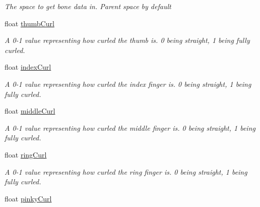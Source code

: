 \begin{DoxyCompactItemize}
\begin{DoxyCompactList}\small\item\em The space to get bone data in. Parent space by default \end{DoxyCompactList}\item 
float \mbox{\hyperlink{class_valve_1_1_v_r_1_1_steam_v_r___action___skeleton___source_a7fa8a03fba2900cca13741074183a169}{thumb\+Curl}}
\begin{DoxyCompactList}\small\item\em A 0-\/1 value representing how curled the thumb is. 0 being straight, 1 being fully curled. \end{DoxyCompactList}\item 
float \mbox{\hyperlink{class_valve_1_1_v_r_1_1_steam_v_r___action___skeleton___source_a79620bcbfdd095ddd03a1bb72da2bd0b}{index\+Curl}}
\begin{DoxyCompactList}\small\item\em A 0-\/1 value representing how curled the index finger is. 0 being straight, 1 being fully curled. \end{DoxyCompactList}\item 
float \mbox{\hyperlink{class_valve_1_1_v_r_1_1_steam_v_r___action___skeleton___source_a5be1629291d3e36faa1db01c239cb482}{middle\+Curl}}
\begin{DoxyCompactList}\small\item\em A 0-\/1 value representing how curled the middle finger is. 0 being straight, 1 being fully curled. \end{DoxyCompactList}\item 
float \mbox{\hyperlink{class_valve_1_1_v_r_1_1_steam_v_r___action___skeleton___source_a42e383285b52b18d4ab8e6e095895846}{ring\+Curl}}
\begin{DoxyCompactList}\small\item\em A 0-\/1 value representing how curled the ring finger is. 0 being straight, 1 being fully curled. \end{DoxyCompactList}\item 
float \mbox{\hyperlink{class_valve_1_1_v_r_1_1_steam_v_r___action___skeleton___source_ad3b7dcc83376c702aa866eff8fe0fb61}{pinky\+Curl}}

\end{DoxyCompactItemize}
